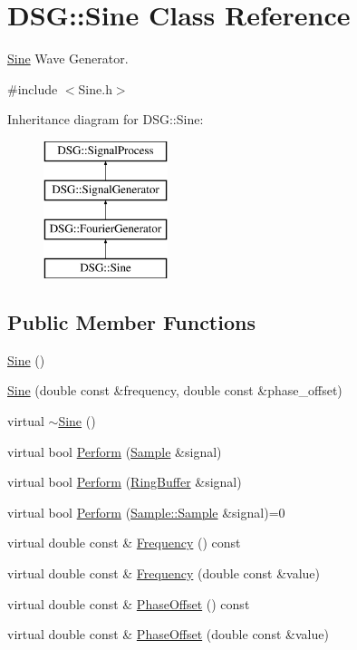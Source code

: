 \hypertarget{classDSG_1_1Sine}{\section{D\+S\+G\+:\+:Sine Class Reference}
\label{classDSG_1_1Sine}
}


\hyperlink{classDSG_1_1Sine}{Sine} Wave Generator.  




{\ttfamily \#include $<$Sine.\+h$>$}

Inheritance diagram for D\+S\+G\+:\+:Sine\+:\begin{figure}[H]
\begin{center}
\leavevmode
\includegraphics[height=4.000000cm]{classDSG_1_1Sine}
\end{center}
\end{figure}
\subsection*{Public Member Functions}
\begin{DoxyCompactItemize}
\item 
\hyperlink{classDSG_1_1Sine_ab8dcc9f9885ab30c3aa81719c764d392}{Sine} ()
\item 
\hyperlink{classDSG_1_1Sine_aadedca66967e66cc615d8c5ce3eec6e8}{Sine} (double const \&frequency, double const \&phase\+\_\+offset)
\item 
virtual \hyperlink{classDSG_1_1Sine_acf3012137866fa71d727d2ccfb59ddac}{$\sim$\+Sine} ()
\item 
virtual bool \hyperlink{classDSG_1_1Sine_a04d925dc8c9a4b320f21697ce853a407}{Perform} (\hyperlink{classDSG_1_1Sample}{Sample} \&signal)
\item 
virtual bool \hyperlink{classDSG_1_1Sine_a6408fedf61f1f2a4026261d181997afc}{Perform} (\hyperlink{classDSG_1_1RingBuffer}{Ring\+Buffer} \&signal)
\item 
virtual bool \hyperlink{classDSG_1_1SignalProcess_afdb8220100418893950c1161dd24db67}{Perform} (\hyperlink{classDSG_1_1Sample_aaf2e30d73911eccea99b53eeee15b612}{Sample\+::\+Sample} \&signal)=0
\item 
virtual double const \& \hyperlink{classDSG_1_1SignalGenerator_aedac746c5a70818d120858542ecb7c45}{Frequency} () const 
\item 
virtual double const \& \hyperlink{classDSG_1_1SignalGenerator_ae3ce8d45bafabbd86a0f535b15c3cd46}{Frequency} (double const \&value)
\item 
virtual double const \& \hyperlink{classDSG_1_1SignalGenerator_a1ce521847edd0b837fd840998f906b4b}{Phase\+Offset} () const 
\item 
virtual double const \& \hyperlink{classDSG_1_1SignalGenerator_a08b71b1f30ba65e629642c570291dc0e}{Phase\+Offset} (double const \&value)
\end{DoxyCompactItemize}

